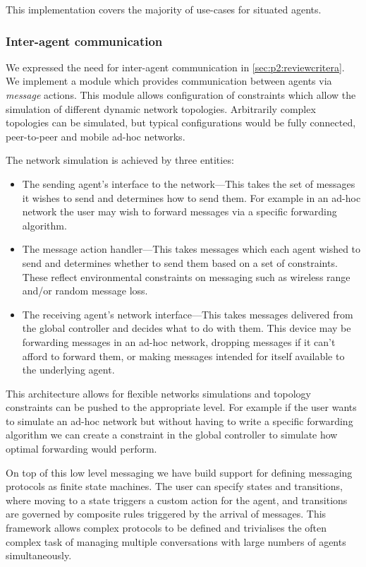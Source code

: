 This implementation covers the majority of use-cases for situated agents.

\subsubsection*{Inter-agent communication}

We expressed the need for inter-agent communication in \autoref{sec:p2:reviewcritera}.
We implement a module which provides communication between agents via \emph{
message} actions. This module allows configuration of constraints which allow the
simulation of different dynamic network topologies. Arbitrarily complex
topologies can be simulated, but typical configurations would be fully
connected, peer-to-peer and mobile ad-hoc networks.

The network simulation is achieved by three entities:
\begin{itemize}
	\item The sending agent's interface to the network---This takes the set
	of messages it wishes to send and determines how to send them. For
	example in an ad-hoc network the user may wish to forward messages
	via a specific forwarding algorithm. 
	\item The message action handler---This takes messages which each agent
	wished to send and determines whether to send them based on a set
	of constraints. These reflect environmental constraints on messaging
	such as wireless range and/or random message loss.
	\item The receiving agent's network interface---This takes messages delivered
	from the global controller and decides what to do with them. This
	device may be forwarding messages in an ad-hoc network, dropping messages
	if it can't afford to forward them, or making messages intended for
	itself available to the underlying agent.
\end{itemize}

This architecture allows for flexible networks simulations and topology
constraints can be pushed to the appropriate level. For example if the user
wants to simulate an ad-hoc network but without having to write a specific
forwarding algorithm we can create a constraint in the global controller to
simulate how optimal forwarding would perform.

On top of this low level messaging we have build support for defining
messaging protocols as finite state machines. The user can specify
states and transitions, where moving to a state triggers a custom
action for the agent, and transitions are governed by composite rules
triggered by the arrival of messages. This framework allows complex
protocols to be defined and trivialises the often complex task of
managing multiple conversations with large numbers of agents simultaneously.

